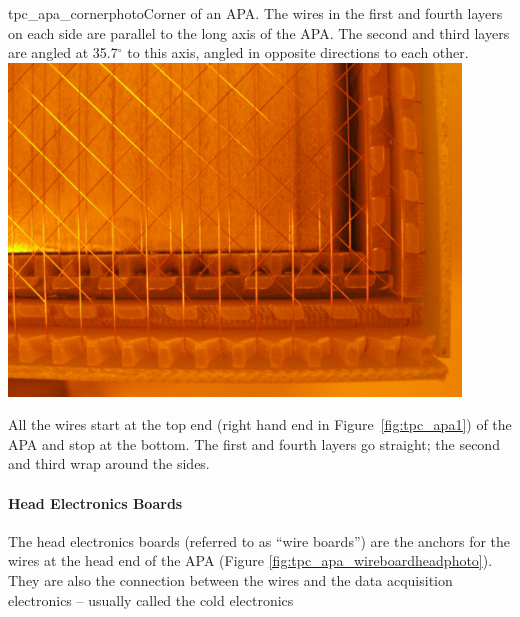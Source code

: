 \begin{cdrfigure}{tpc_apa_cornerphoto}{Corner of an APA.  The wires in the first and fourth layers on each side are parallel to the long axis of the APA.  The second and third layers are angled at 35.7$^{\circ}$ to this axis, angled in opposite directions to each other.}
\includegraphics[width=0.9\textwidth]{figures/tpc_apa_cornerphoto.png} 
\end{cdrfigure}

All the wires start at the top end (right hand end in Figure~\ref{fig:tpc_apa1})  of the APA and stop at the bottom. The first and fourth layers go straight; the second and third wrap around the sides. 

\paragraph{Head Electronics Boards}

The head electronics boards (referred to as ``wire boards'') are the anchors for the wires at the head end of the APA (Figure \ref{fig:tpc_apa_wireboardheadphoto}).  They are also the connection between the wires and the data acquisition electronics -- usually called the cold electronics

